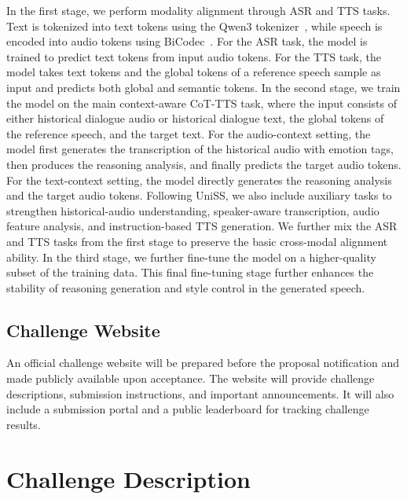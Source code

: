 \documentclass[a4paper]{article}
\begin{document}
\noindent In the first stage, we perform modality alignment through ASR and TTS tasks. Text is tokenized into text tokens using the Qwen3 tokenizer~\cite{qwen3technicalreport}, while speech is encoded into audio tokens using BiCodec~\cite{wang2025spark}. For the ASR task, the model is trained to predict text tokens from input audio tokens. For the TTS task, the model takes text tokens and the global tokens of a reference speech sample as input and predicts both global and semantic tokens. In the second stage, we train the model on the main context-aware CoT-TTS task, where the input consists of either historical dialogue audio or historical dialogue text, the global tokens of the reference speech, and the target text. For the audio-context setting, the model first generates the transcription of the historical audio with emotion tags, then produces the reasoning analysis, and finally predicts the target audio tokens. For the text-context setting, the model directly generates the reasoning analysis and the target audio tokens. Following UniSS, we also include auxiliary tasks to strengthen historical-audio understanding, speaker-aware transcription, audio feature analysis, and instruction-based TTS generation. We further mix the ASR and TTS tasks from the first stage to preserve the basic cross-modal alignment ability. In the third stage, we further fine-tune the model on a higher-quality subset of the training data. This final fine-tuning stage further enhances the stability of reasoning generation and style control in the generated speech.

\subsection{Challenge Website}

An official challenge website will be prepared before the proposal notification and made publicly available upon acceptance. The website will provide challenge descriptions, submission instructions, and important announcements. It will also include a submission portal and a public leaderboard for tracking challenge results. 


\section{Challenge Description}
\end{document}

